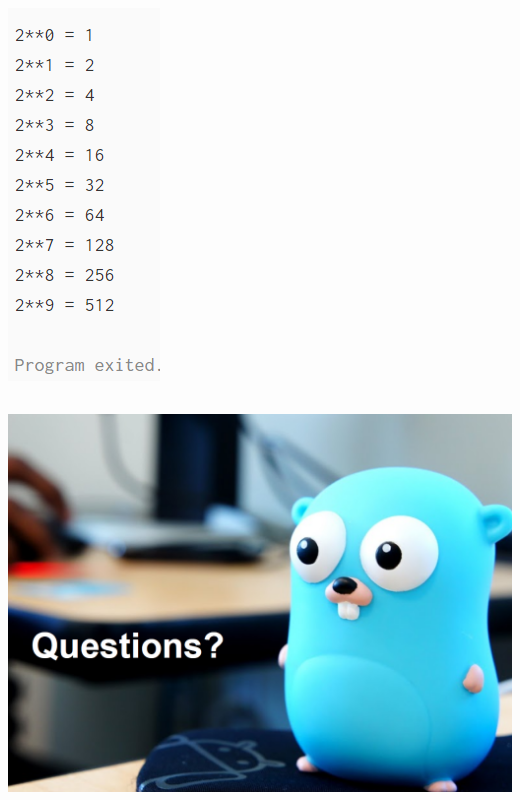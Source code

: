 \documentclass[14pt]{beamer}
\begin{document}
{\begin{frame}
\begin{columns}
\begin{column}{0.3\textwidth}
        \includegraphics[width=0.7\linewidth]{img/rangeoutput.PNG}
        \end{column}
    \end{columns}
\end{frame}
}

{
\begin{frame}
        \includegraphics[width=\textwidth]{img/questions.PNG}
\end{frame}
}
\end{document}
